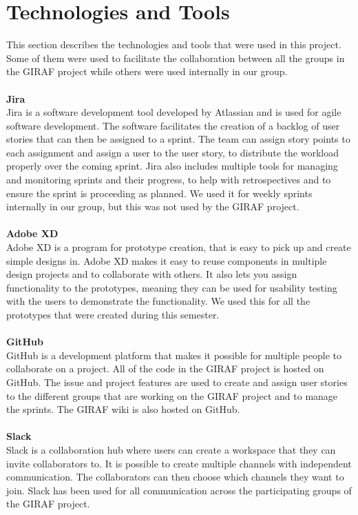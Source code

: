 \section{Technologies and Tools}\label{technologies-and-tools}
This section describes the technologies and tools that were used in this project. 
Some of them were used to facilitate the collaboration between all the groups in the GIRAF project while others were used internally in our group.
\\\\
\textbf{Jira}\\
Jira is a software development tool developed by Atlassian and is used for agile software development.
The software facilitates the creation of a backlog of user stories that can then be assigned to a sprint.
The team can assign story points to each assignment and assign a user to the user story, to distribute the workload properly over the coming sprint.
Jira also includes multiple tools for managing and monitoring sprints and their progress, to help with retrospectives and to ensure the sprint is proceeding as planned.
We used it for weekly sprints internally in our group, but this was not used by the GIRAF project.
\\\\
\textbf{Adobe XD}\\
Adobe XD is a program for prototype creation, that is easy to pick up and create simple designs in.
Adobe XD makes it easy to reuse components in multiple design projects and to collaborate with others.
It also lets you assign functionality to the prototypes, meaning they can be used for usability testing with the users to demonstrate the functionality.
We used this for all the prototypes that were created during this semester.
\\\\
\textbf{GitHub}\\
GitHub is a development platform that makes it possible for multiple people to collaborate on a project. 
All of the code in the GIRAF project is hosted on GitHub.
The issue and project features are used to create and assign user stories to the different groups that are working on the GIRAF project and to manage the sprints. 
The GIRAF wiki is also hosted on GitHub.
\\\\
\textbf{Slack}\\
Slack is a collaboration hub where users can create a workspace that they can invite collaborators to.
It is possible to create multiple channels with independent communication. 
The collaborators can then choose which channels they want to join.
Slack has been used for all communication across the participating groups of the GIRAF project.
